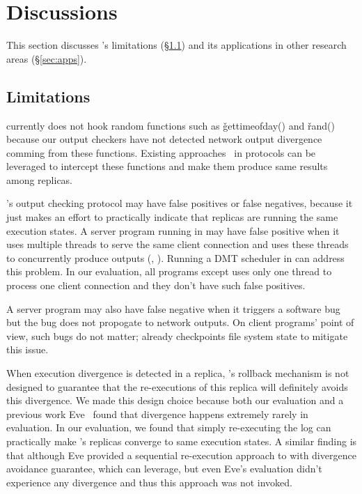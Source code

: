 \section{Discussions}\label{sec:discuss}

This section discusses \xxx's limitations (\S\ref{sec:limits}) and its 
applications in other research areas (\S\ref{sec:apps}).

\subsection{Limitations}\label{sec:limits}


\xxx currently does not hook random functions such as \v{gettimeofday()} and 
\v{rand()} because our output checkers have not detected network output 
divergence comming from these functions. Existing 
approaches~\cite{eve:osdi12,paxos:practical} in \paxos protocols can be 
leveraged to intercept these functions and make them produce same results among 
replicas.


\xxx's output checking protocol may have false positives or false negatives, 
because it just makes an effort to practically indicate that replicas are 
running the same execution states. A server program running in \xxx may have 
false positive when it uses multiple threads to serve the same client 
connection and uses these threads to concurrently produce outputs 
(\eg, \clamav). Running a DMT scheduler in \xxx can address this problem. In 
our evaluation, all programs except \clamav uses only one thread to process one 
client connection and they don't have such false positives.

A server program may also have false negative when it triggers a software bug 
but the bug does not propogate to network outputs. On client programs' point of 
view, such bugs do not matter; \xxx already checkpoints file system state to 
mitigate this issue.

When execution divergence is detected in a replica, \xxx's rollback mechanism 
is not designed to guarantee that the re-executions of this replica will 
definitely avoids this divergence. We made this design choice because both 
our evaluation and a previous work Eve~\cite{eve:osdi12} found that divergence 
happens extremely rarely in evaluation. In our evaluation, we found that simply 
re-executing the log can practically make \xxx's replicas converge to 
same execution states. A similar finding is that although Eve provided a 
sequential re-execution approach to with divergence avoidance guarantee, which 
\xxx can leverage, but even Eve's evaluation didn't experience any divergence 
and thus this approach was not invoked.

